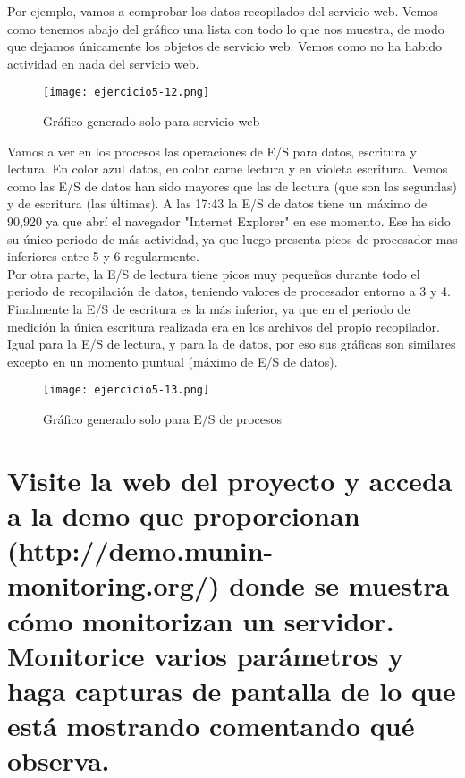 	Por ejemplo, vamos a comprobar los datos recopilados del servicio web. Vemos como tenemos abajo del gráfico una lista con todo lo que nos muestra, de modo que dejamos únicamente los objetos de servicio web. Vemos como no ha habido actividad en nada del servicio web.
	\begin{figure}[H] 
		\centering
		\texttt{[image: ejercicio5-12.png]} 
		\label{figura2} 			
		\caption{Gráfico generado solo para servicio web}
	\end{figure}
	
	Vamos a ver en los procesos las operaciones de E/S para datos, escritura y lectura. En color azul datos, en color carne lectura y en violeta escritura. Vemos como las E/S de datos han sido mayores que las de lectura (que son las segundas) y de escritura (las últimas). A las 17:43 la E/S de datos tiene un máximo de 90,920 ya que abrí el navegador "Internet Explorer" en ese momento. Ese ha sido su único periodo de más actividad, ya que luego presenta picos de procesador mas inferiores entre 5 y 6 regularmente.\\
	Por otra parte, la E/S de lectura tiene picos muy pequeños durante todo el periodo de recopilación de datos, teniendo valores de procesador entorno a 3 y 4.\\
	Finalmente la E/S de escritura es la más inferior, ya que en el periodo de medición la única escritura realizada era en los archivos del propio recopilador. Igual para la E/S de lectura, y para la de datos, por eso sus gráficas son similares excepto en un momento puntual (máximo de E/S de datos).
	
	\begin{figure}[H] 
		\centering
		\texttt{[image: ejercicio5-13.png]} 
		\label{figura2} 			
		\caption{Gráfico generado solo para E/S de procesos}
	\end{figure}
	
	\section{Visite la web del proyecto y acceda a la demo que proporcionan (http://demo.munin-monitoring.org/) donde se muestra cómo monitorizan un servidor. Monitorice varios parámetros y haga capturas de pantalla de lo que está mostrando comentando qué observa.}
	
